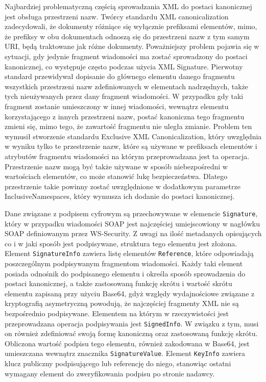 Najbardziej  problematyczną częścią sprowadzania XML do postaci kanonicznej jest obsługa przestrzeni nazw. Twórcy standardu XML canonicalization zadecydowali, że dokumenty różniące się wyłącznie prefiksami elementów, mimo, że prefiksy w obu dokumentach odnoszą się do przestrzeni nazw z tym samym URI, będą traktowane jak różne dokumenty. Poważniejszy problem pojawia się w sytuacji, gdy jedynie fragment wiadomości ma zostać sprowadzony do postaci kanonicznej, co występuje często podczas użycia XML Signature. Pierwotny standard przewidywał dopisanie do głównego elementu danego fragmentu wszystkich przestrzeni nazw zdefiniowanych w elementach nadrzędnych, także tych nieużywanych przez dany fragment wiadomości. W przypadku gdy taki fragment zostanie umieszczony w innej wiadomości, wewnątrz elementu korzystającego z innych przestrzeni nazw, postać kanoniczna tego fragmentu zmieni się, mimo tego, że zawartość fragmentu nie uległa zmianie. Problem ten wymusił stworzenie standardu Exclusive XML Canonicalization, który uwzględnia w wyniku tylko te przestrzenie nazw, które są używane w prefiksach elementów i atrybutów fragmentu wiadomości na którym przeprowadzana jest ta operacja\cite{Boyer:02:EXC}. Przestrzenie nazw mogą być także używane w sposób niebezpośredni w wartościach elementów, co może stanowić lukę bezpieczeństwa. Dlatego przestrzenie takie powinny zostać uwzględnione w dodatkowym parametrze InclusiveNamespaces, który wymusza ich dodanie do postaci kanonicznej.
	
Dane związane z podpisem cyfrowym są przechowywane w elemencie \texttt{Signature}\cite{Eastlake:08:XSS}, który w przypadku wiadomości SOAP jest najczęściej umiejscowiony w nagłówku SOAP definiowanym przez WS-Security. Z uwagi na ilość metadanych opisujących co i w jaki sposób jest podpisywane, struktura tego elementu jest złożona. Element \texttt{SignatureInfo} zawiera listę elementów \texttt{Reference}, które odpowiadają poszczególnym podpisywanym fragmentom wiadomości. Każdy taki element posiada odnośnik do podpisanego elementu i określa sposób sprowadzenia do postaci kanonicznej, a także zastosowaną funkcję skrótu i wartość skrótu elementu zapisaną przy użyciu Base64, gdyż względy wydajnościowe związane z kryptografią asymetryczną powodują, że najczęściej fragmenty XML nie są bezpośrednio podpisywane. Elementem na którym w rzeczywistości jest przeprowadzana operacja podpisywania jest \texttt{SignedInfo}. W związku z tym, musi on również zdefiniować swoją formę kanoniczną oraz zastosowaną funkcję skrótu. Obliczona wartość podpisu tego elementu, również zakodowana w Base64,  jest umieszczana wewnątrz znacznika \texttt{SignatureValue}. Element \texttt{KeyInfo} zawiera klucz publiczny podpisującego lub referencję do niego, stanowiąc ostatni wymagany element do zweryfikowania podpisu po stronie nadawcy.
